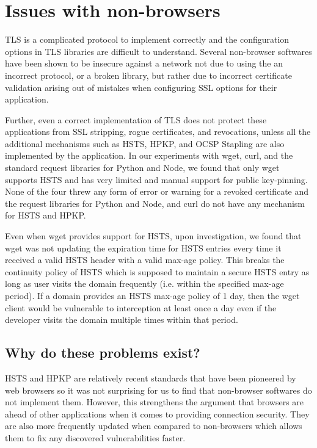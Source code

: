 \section{Issues with non-browsers}
\label{sec:problems-saber}

TLS is a complicated protocol to implement correctly and the configuration
options in TLS libraries are difficult to understand. Several non-browser
softwares have been shown to be insecure against a network not due to using the
an incorrect protocol, or a broken library, but rather due to incorrect
certificate validation arising out of mistakes when configuring SSL options for
their application.

Further, even a correct implementation of TLS does not protect these
applications from SSL stripping, rogue certificates, and revocations, unless
all the additional mechanisms such as HSTS, HPKP, and OCSP Stapling are also
implemented by the application. In our experiments with wget, curl, and the
standard request libraries for Python and Node, we found that only wget
supports HSTS and has very limited and manual support for public key-pinning.
None of the four threw any form of error or warning for a revoked certificate
and the request libraries for Python and Node, and curl do not have any
mechanism for HSTS and HPKP.

Even when wget provides support for HSTS, upon investigation, we found that
wget was not updating the expiration time for HSTS entries every time it
received a valid HSTS header with a valid max-age policy. This breaks the
continuity policy of HSTS which is supposed to maintain a secure HSTS entry as
long as user visits the domain frequently (i.e. within the specified max-age
period). If a domain provides an HSTS max-age policy of 1 day, then the wget
client would be vulnerable to interception at least once a day even if the
developer visits the domain multiple times within that period.

\subsection{Why do these problems exist?}

HSTS and HPKP are relatively recent standards that have been pioneered by web
browsers so it was not surprising for us to find that non-browser softwares do
not implement them. However, this strengthens the argument that browsers are
ahead of other applications when it comes to providing connection security.
They are also more frequently updated when compared to non-browsers which
allows them to fix any discovered vulnerabilities faster.

